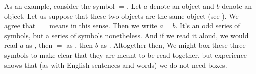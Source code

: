 %
%
%
%
%
%
%
%
%


As an example, consider the symbol $=$.
Let $a$ denote an object and $b$ denote an object.
Let us suppose that these two objects are the same object (see ).
We agree that $=$ means  in this sense.
Then we write $a = b$.
It's an odd series of symbols, but a series of symbols nonetheless.
And if we read it aloud, we would read $a$ as , then $=$ as , then $b$ as .
Altogether then, 
We might box these three symbols  to make clear that they are meant to be read together, but experience shows that (as with English sentences and words) we do not need boxes.


